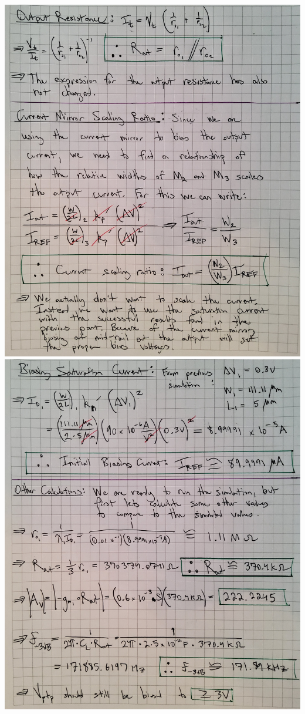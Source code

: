 \documentclass[12pt, fleqn]{article}
\begin{document}
\includegraphics[scale=0.165, center]{p2b_2.jpg}\\
\newpage
\includegraphics[scale=0.165, center]{p2b_3.jpg}\\
\newpage
\end{document}
